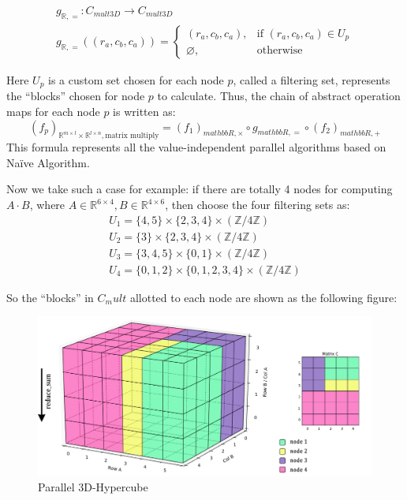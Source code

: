 \documentclass{amsart}
\theoremstyle{definition}
\theoremstyle{remark}
\numberwithin{equation}{section}
\begin{document}
\begin{equation}
\begin{array}{l}  
g_{\mathbb{R},=}:C_{mult3D}\to C_{mult3D}\\
g_{\mathbb{R},=}((r_a,c_b,c_a))=
	\left\{
	\begin{array}{ll}  
          (r_a,c_b,c_a), &\text{if } (r_a,c_b,c_a)\in U_p  \\ 
          \varnothing, &\text{otherwise}
	\end{array}
	\right.
\end{array}
\end{equation} 
\par
	Here $U_p$ is a custom set chosen for each node $p$, called a filtering set, represents the “blocks” chosen for node $p$ to calculate. Thus, the chain of abstract operation maps for each node $p$ is written as:
\begin{equation}
(f_p)_{\mathbb{R}^{m\times l}\times\mathbb{R}^{l\times n},\text{matrix multiply}}=
(f_1)_{mathbb{R},\times}\circ g_{mathbb{R},=}\circ(f_2)_{mathbb{R},+}
\end{equation}
This formula represents all the value-independent parallel algorithms based on Naïve Algorithm.
\par
Now we take such a case for example: if there are totally 4 nodes for computing $A\cdot B$, where $A\in \mathbb{R}^{6\times4},B\in \mathbb{R}^{4\times6}$, then choose the four filtering sets as:
\begin{equation}
\begin{array}{l}  
      U_1=\{4,5\}\times\{2,3,4\}\times(\mathbb{Z}/4\mathbb{Z}) \\ U_2=\{3\}\times\{2,3,4\}\times(\mathbb{Z}/4\mathbb{Z})\\ 
      U_3=\{3,4,5\}\times\{0,1\}\times(\mathbb{Z}/4\mathbb{Z}) \\ U_4=\{0,1,2\}\times\{0,1,2,3,4\}\times(\mathbb{Z}/4\mathbb{Z}) 
\end{array}
\end{equation}
\par
So the “blocks” in ${C_mult}$ allotted to each node are shown as the following figure:\\
\begin{figure}[h]
	\includegraphics[scale=0.35]{Figures/Matrix3d_Filter.png}
	\caption{Parallel 3D-Hypercube}
\end{figure}
\end{document}
